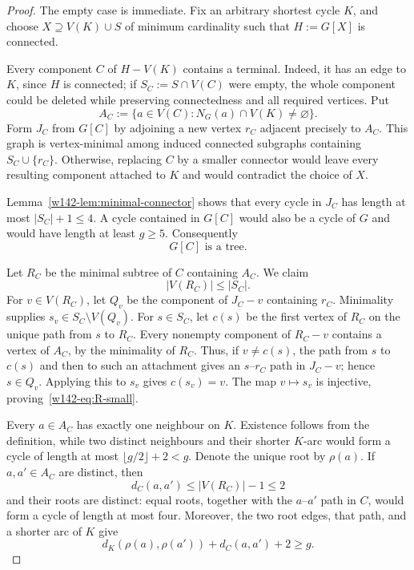 \documentclass[11pt]{article}
\numberwithin{equation}{section}
\theoremstyle{remark}
\begin{document}
\begin{proof}
The empty case is immediate.  Fix an arbitrary shortest cycle $K$, and
choose $X\supseteq V(K)\cup S$ of minimum cardinality such that
$H:=G[X]$ is connected.

Every component $C$ of $H-V(K)$ contains a terminal.  Indeed, it has an
edge to $K$, since $H$ is connected; if $S_C:=S\cap V(C)$ were empty, the
whole component could be deleted while preserving connectedness and all
required vertices.  Put
\[
 A_C:=\{a\in V(C):N_G(a)\cap V(K)\ne\varnothing\}.
\]
Form $J_C$ from $G[C]$ by adjoining a new vertex $r_C$ adjacent precisely
to $A_C$.  This graph is vertex-minimal among induced connected subgraphs
containing $S_C\cup\{r_C\}$.  Otherwise, replacing $C$ by a smaller
connector would leave every resulting component attached to $K$ and would
contradict the choice of $X$.

Lemma~\ref{w142-lem:minimal-connector} shows that every cycle in $J_C$ has length
at most $|S_C|+1\le4$.  A cycle contained in $G[C]$ would also be a cycle of
$G$ and would have length at least $g\ge5$.  Consequently
\begin{equation}\label{w142-eq:C-tree}
  G[C]\text{ is a tree}.
\end{equation}

Let $R_C$ be the minimal subtree of $C$ containing $A_C$.  We claim
\begin{equation}\label{w142-eq:R-small}
  |V(R_C)|\le |S_C|.
\end{equation}
For $v\in V(R_C)$, let $Q_v$ be the component of $J_C-v$ containing $r_C$.
Minimality supplies $s_v\in S_C\setminus V(Q_v)$.  For $s\in S_C$, let
$c(s)$ be the first vertex of $R_C$ on the unique path from $s$ to $R_C$.
Every nonempty component of $R_C-v$ contains a vertex of $A_C$, by the
minimality of $R_C$.  Thus, if $v\ne c(s)$, the path from $s$ to $c(s)$ and
then to such an attachment gives an $s$--$r_C$ path in $J_C-v$; hence
$s\in Q_v$.  Applying this to $s_v$ gives $c(s_v)=v$.  The map
$v\mapsto s_v$ is injective, proving~\eqref{w142-eq:R-small}.

Every $a\in A_C$ has exactly one neighbour on $K$.  Existence follows from
the definition, while two distinct neighbours and their shorter $K$-arc
would form a cycle of length at most $\lfloor g/2\rfloor+2<g$.  Denote the
unique root by $\rho(a)$.  If $a,a'\in A_C$ are distinct, then
\begin{equation}\label{w142-eq:attachment-distance}
 d_C(a,a')\le |V(R_C)|-1\le2
\end{equation}
and their roots are distinct: equal roots, together with the
$a$--$a'$ path in $C$, would form a cycle of length at most four.  Moreover,
the two root edges, that path, and a shorter arc of $K$ give
\begin{equation}\label{w142-eq:girth-roots}
 d_K(\rho(a),\rho(a'))+d_C(a,a')+2\ge g.
\end{equation}


\end{proof}
\end{document}
